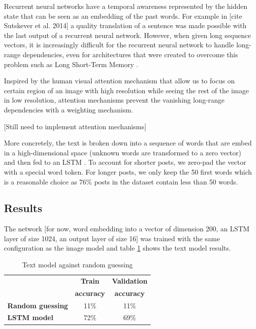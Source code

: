 \documentclass{article} %
\begin{document}
Recurrent neural networks have a temporal awareness represented by the hidden state that can be seen as an embedding of the past words. For example in [cite Sutskever et al. 2014] a quality translation of a sentence was made possible with the last output of a recurrent neural network. However, when given long sequence vectors, it is increasingly difficult for the recurrent neural network to handle long-range dependencies, even for architectures that were created to overcome this problem such as Long Short-Term Memory \citep{Hochreiter-97}.

Inspired by the human visual attention mechanism \citep{Fischer-87} that allow us to focus on certain region of an image with high resolution while seeing the rest of the image in low resolution, attention mechanisms \citep{Bahdanau-15} prevent the vanishing long-range dependencies with a weighting mechanism.

[Still need to implement attention mechanisms]

More concretely, the text is broken down into a sequence of words that are embed in a high-dimensional space (unknown words are transformed to a zero vector) and then fed to an LSTM . To account for shorter posts, we zero-pad the vector with a special word token. For longer posts, we only keep the 50 first words which is a reasonable choice as 76\% posts in the dataset contain less than 50 words.

\subsection{Results}
The network [for now, word embedding into a vector of dimension 200, an LSTM layer of size 1024, an output layer of size 16] was trained with the same configuration as the image model and table \ref{text-results} shows the text model results.

\begin{table}[H]
\caption{Text model against random guessing}
\begin{center}
    \begin{tabular}{l | c | c}
    & \textbf{Train} & \textbf{Validation} \\
    & \textbf{accuracy} & \textbf{accuracy} \\ \hline
    \textbf{Random guessing} & 11\% & 11\% \\ \hline
    \textbf{LSTM model}  & 72\% & 69\% \\
    \end{tabular}
\end{center}
\label{text-results}
\end{table}
\end{document}
